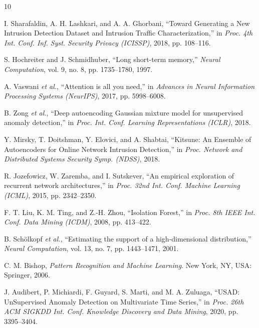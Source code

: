 \documentclass[conference]{IEEEtran}
\begin{document}

\begin{thebibliography}{10}

I. Sharafaldin, A. H. Lashkari, and A. A. Ghorbani,
``Toward Generating a New Intrusion Detection Dataset and Intrusion Traffic Characterization,''
in \textit{Proc. 4th Int. Conf. Inf. Syst. Security Privacy (ICISSP)}, 2018, pp. 108--116.

S. Hochreiter and J. Schmidhuber,
``Long short-term memory,''
\textit{Neural Computation}, vol. 9, no. 8, pp. 1735--1780, 1997.

A. Vaswani \textit{et al.},
``Attention is all you need,''
in \textit{Advances in Neural Information Processing Systems (NeurIPS)}, 2017, pp. 5998--6008.

B. Zong \textit{et al.},
``Deep autoencoding Gaussian mixture model for unsupervised anomaly detection,''
in \textit{Proc. Int. Conf. Learning Representations (ICLR)}, 2018.

Y. Mirsky, T. Doitshman, Y. Elovici, and A. Shabtai,
``Kitsune: An Ensemble of Autoencoders for Online Network Intrusion Detection,''
in \textit{Proc. Network and Distributed Systems Security Symp. (NDSS)}, 2018.

R. Jozefowicz, W. Zaremba, and I. Sutskever,
``An empirical exploration of recurrent network architectures,''
in \textit{Proc. 32nd Int. Conf. Machine Learning (ICML)}, 2015, pp. 2342--2350.

F. T. Liu, K. M. Ting, and Z.-H. Zhou,
``Isolation Forest,''
in \textit{Proc. 8th IEEE Int. Conf. Data Mining (ICDM)}, 2008, pp. 413--422.

B. Sch\"{o}lkopf \textit{et al.},
``Estimating the support of a high-dimensional distribution,''
\textit{Neural Computation}, vol. 13, no. 7, pp. 1443--1471, 2001.

C. M. Bishop,
\textit{Pattern Recognition and Machine Learning}.
New York, NY, USA: Springer, 2006.

J. Audibert, P. Michiardi, F. Guyard, S. Marti, and M. A. Zuluaga,
``USAD: UnSupervised Anomaly Detection on Multivariate Time Series,''
in \textit{Proc. 26th ACM SIGKDD Int. Conf. Knowledge Discovery and Data Mining}, 2020,
pp. 3395--3404.

\end{thebibliography}
\end{document}

